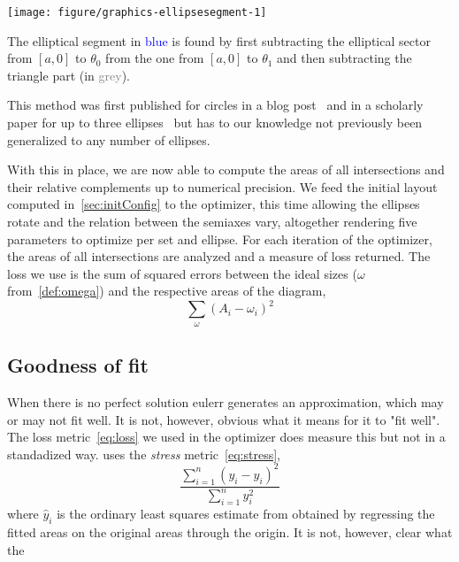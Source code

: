\documentclass[
  a4paper,
  nofonts,
  nobib,
  titlepage,
  justified,
  marginals=raggedouter,
  nohyper
]{tufte-handout}\usepackage[]{graphicx}\usepackage[]{color}
\newenvironment{knitrout}{}{} %
\newcommand{\pkg}[1]{{\fontseries{b}\selectfont #1}}
\begin{document}
\begin{marginfigure}
\begin{knitrout}
\color{fgcolor}

{\centering \texttt{[image: figure/graphics-ellipsesegment-1]} 

}



\end{knitrout}
\caption{The elliptical segment in \textcolor{blue}{blue} is found by first subtracting the elliptical sector from $[a, 0]$ to $\theta_0$ from the one from $[a, 0]$ to $\theta_1$ and then subtracting the triangle part (in \textcolor{grey}{grey}).}
\label{fig:ellipsesegment}
\end{marginfigure}

This method was first published for circles in a blog
post~\citep{frederickson_2013} and in a scholarly paper for up to three
ellipses~\citep{micaleff_2013} but has to
our knowledge not previously been generalized to any number of ellipses.

With this in place, we are now able to compute the areas of all
intersections and their relative complements up to numerical precision.
We feed the initial layout computed in~\cref{sec:initConfig}
to the optimizer, this time allowing the ellipses rotate and the relation
between the semiaxes vary, altogether rendering five parameters to optimize per
set and ellipse. For each iteration of the
optimizer, the areas of all intersections are analyzed and a measure of
loss returned. The loss we use is the sum of squared errors
between the ideal sizes ($\omega$ from~\cref{def:omega}) and
the respective areas of the diagram,
\begin{equation}
\sum_\omega  (A_i-\omega_i)^2
\label{eq:loss}
\end{equation}

\subsection{Goodness of fit}

When there is no perfect solution \pkg{eulerr} generates
an approximation, which may or may not fit well. It is not, however, obvious
what it means for it to "fit well". The loss metric~\eqref{eq:loss} we used in
the optimizer does measure this but not in a standadized way.
\citet{wilkinson_2012} uses the \emph{stress} metric~\eqref{eq:stress},
\begin{equation}
\frac{\sum_{i=1}^n (y_i - \hat{y}_i) ^ 2}{\sum_{i=1}^n y_i^2}
\label{eq:stress}
\end{equation}
where $\hat{y}_i$ is the ordinary least squares estimate from obtained by
regressing the fitted areas on the original areas through the
origin. It is not, however, clear what the
\end{document}
